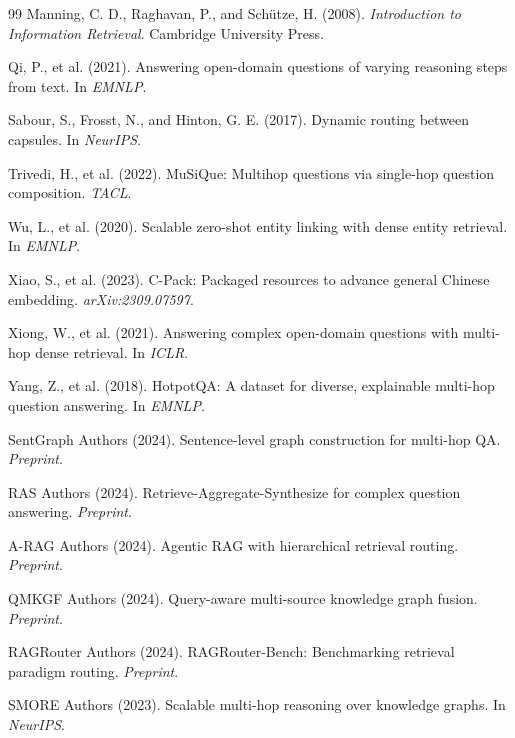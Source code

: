 \documentclass[11pt,a4paper]{article}
\begin{document}
\begin{thebibliography}{99}
Manning, C. D., Raghavan, P., and Schütze, H. (2008).
\textit{Introduction to Information Retrieval}.
Cambridge University Press.

Qi, P., et al. (2021).
Answering open-domain questions of varying reasoning steps from text.
In \textit{EMNLP}.

Sabour, S., Frosst, N., and Hinton, G. E. (2017).
Dynamic routing between capsules.
In \textit{NeurIPS}.

Trivedi, H., et al. (2022).
MuSiQue: Multihop questions via single-hop question composition.
\textit{TACL}.

Wu, L., et al. (2020).
Scalable zero-shot entity linking with dense entity retrieval.
In \textit{EMNLP}.

Xiao, S., et al. (2023).
C-Pack: Packaged resources to advance general Chinese embedding.
\textit{arXiv:2309.07597}.

Xiong, W., et al. (2021).
Answering complex open-domain questions with multi-hop dense retrieval.
In \textit{ICLR}.

Yang, Z., et al. (2018).
HotpotQA: A dataset for diverse, explainable multi-hop question answering.
In \textit{EMNLP}.

SentGraph Authors (2024).
Sentence-level graph construction for multi-hop QA.
\textit{Preprint}.

RAS Authors (2024).
Retrieve-Aggregate-Synthesize for complex question answering.
\textit{Preprint}.

A-RAG Authors (2024).
Agentic RAG with hierarchical retrieval routing.
\textit{Preprint}.

QMKGF Authors (2024).
Query-aware multi-source knowledge graph fusion.
\textit{Preprint}.

RAGRouter Authors (2024).
RAGRouter-Bench: Benchmarking retrieval paradigm routing.
\textit{Preprint}.

SMORE Authors (2023).
Scalable multi-hop reasoning over knowledge graphs.
In \textit{NeurIPS}.

\end{thebibliography}
\end{document}
